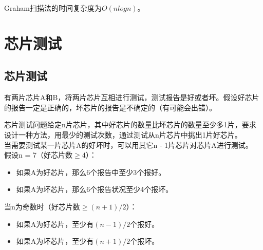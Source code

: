 Graham扫描法的时间复杂度为$ O(nlogn) $。

\newpage

\section{芯片测试}

\subsection{芯片测试}

有两片芯片A和B，将两片芯片互相进行测试，测试报告是好或者坏。假设好芯片的报告一定是正确的，坏芯片的报告是不确定的（有可能会出错）。

\begin{table}[H]
	\centering
	\caption{测试结果}
\end{table}

芯片测试问题给定n片芯片，其中好芯片的数量比坏芯片的数量至少多1片，要求设计一种方法，用最少的测试次数，通过测试从n片芯片中挑出1片好芯片。\\

当需要测试某一片芯片A的好坏时，可以用其它n - 1片芯片对芯片A进行测试。\\

假设n = 7（好芯片数$ \ge 4 $）：

\begin{itemize}
	\item 如果A为好芯片，那么6个报告中至少3个报好。
	\item 如果A为坏芯片，那么6个报告状况至少4个报坏。
\end{itemize}

当n为奇数时（好芯片数$ \ge (n + 1) / 2 $）：

\begin{itemize}
	\item 如果A为好芯片，至少有$ (n-1) / 2 $个报好。
	\item 如果A为坏芯片，至少有$ (n+1) / 2 $个报坏。
\end{itemize}

